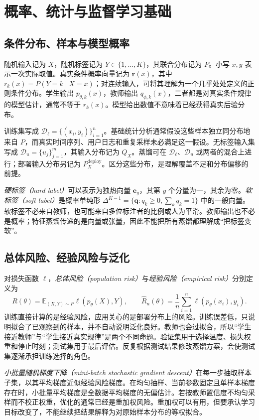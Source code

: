 \documentclass[UTF8,12pt,a4paper,fontset=fandol]{ctexart}
\begin{document}
\section{概率、统计与监督学习基础}
\label{sec:kd-probability}

\subsection{条件分布、样本与模型概率}
随机输入记为 $X$，随机标签记为 $Y\in\{1,\ldots,K\}$，其联合分布记为 $P$。小写 $x,y$ 表示一次实际取值。真实条件概率向量记为 $\mathbf r(x)$，其中 $r_k(x)=P(Y=k\mid X=x)$；对连续输入，可将其理解为一个几乎处处定义的正则条件分布。学生输出 $p_{\theta,k}(x)$，教师输出 $q_{\phi,k}(x)$，二者都是对真实条件规律的模型估计，通常不等于 $r_k(x)$。模型给出数值不意味着已经获得真实后验分布。

训练集写成 $\mathcal D_\ell=\{(x_i,y_i)\}_{i=1}^n$。基础统计分析通常假设这些样本独立同分布地来自 $P$，而真实时间序列、用户日志和重复采样未必满足这一假设。无标签输入集写成 $\mathcal D_u=\{u_j\}_{j=1}^m$，其输入分布记为 $Q_X$。蒸馏可在 $\mathcal D_\ell$、$\mathcal D_u$ 或两者的混合上进行；部署输入分布另记为 $P_X^{\mathrm{deploy}}$。区分这些分布，是理解覆盖不足和分布偏移的前提。

\emph{硬标签（hard label）}可以表示为独热向量 $\mathbf e_y$，其第 $y$ 个分量为一，其余为零。\emph{软标签（soft label）}是概率单纯形 $\Delta^{K-1}=\{\mathbf q:q_k\geq0,\sum_kq_k=1\}$ 中的一般向量。软标签不必来自教师，也可能来自多位标注者的比例或人为平滑。教师输出也不必是概率；特征蒸馏传递的是向量或张量，因此不能把所有蒸馏都理解成“把标签变软”。

\subsection{总体风险、经验风险与泛化}
对损失函数 $\ell$，\emph{总体风险（population risk）}与\emph{经验风险（empirical risk）}分别定义为
\begin{equation}
 R(\theta)=\mathbb E_{(X,Y)\sim P}\ell(p_\theta(X),Y),\qquad
 \widehat R_n(\theta)=\frac1n\sum_{i=1}^n\ell(p_\theta(x_i),y_i).
 \label{eq:kd-risk}
\end{equation}
训练直接计算的是经验风险，应用关心的是部署分布上的风险。训练误差低，只说明拟合了已观察到的样本，并不自动说明泛化良好。教师也会过拟合，所以“学生接近教师”与“学生接近真实规律”是两个不同命题。验证集用于选择温度、损失权重和停止时刻；测试集用于最后评估。反复根据测试结果修改蒸馏方案，会使测试集逐渐承担训练选择的角色。

\emph{小批量随机梯度下降（mini-batch stochastic gradient descent）}在每一步抽取样本子集，以其平均梯度近似经验风险梯度。在均匀抽样、当前参数固定且单样本梯度存在时，小批量平均梯度是全数据平均梯度的无偏估计。若按教师置信度不均匀采样而不校正权重，优化的通常已经是重加权风险。重加权可以有用，但要承认学习目标改变了，不能继续把结果解释为对原始样本分布的等权拟合。
\end{document}
